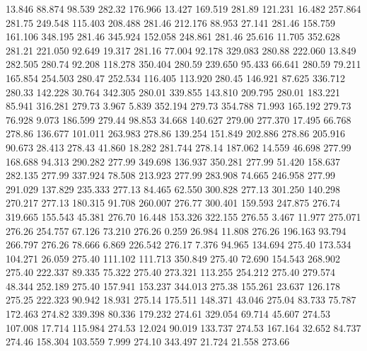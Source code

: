  13.846   88.874   98.539       282.32
 176.966   13.427  169.519       281.89
 121.231   16.482  257.864       281.75
 249.548  115.403  208.488       281.46
 212.176   88.953   27.141       281.46
 158.759  161.106  348.195       281.46
 345.924  152.058  248.861       281.46
  25.616   11.705  352.628       281.21
 221.050   92.649   19.317       281.16
  77.004   92.178  329.083       280.88
 222.060   13.849  282.505       280.74
  92.208  118.278  350.404       280.59
 239.650   95.433   66.641       280.59
  79.211  165.854  254.503       280.47
 252.534  116.405  113.920       280.45
 146.921   87.625  336.712       280.33
 142.228   30.764  342.305       280.01
 339.855  143.810  209.795       280.01
 183.221   85.941  316.281       279.73
   3.967    5.839  352.194       279.73
 354.788   71.993  165.192       279.73
  76.928    9.073  186.599       279.44
  98.853   34.668  140.627       279.00
 277.370   17.495   66.768       278.86
 136.677  101.011  263.983       278.86
 139.254  151.849  202.886       278.86
 205.916   90.673   28.413       278.43
  41.860   18.282  281.744       278.14
 187.062   14.559   46.698       277.99
 168.688   94.313  290.282       277.99
 349.698  136.937  350.281       277.99
  51.420  158.637  282.135       277.99
 337.924   78.508  213.923       277.99
 283.908   74.665  246.958       277.99
 291.029  137.829  235.333       277.13
  84.465   62.550  300.828       277.13
 301.250  140.298  270.217       277.13
 180.315   91.708  260.007       276.77
 300.401  159.593  247.875       276.74
 319.665  155.543   45.381       276.70
  16.448  153.326  322.155       276.55
   3.467   11.977  275.071       276.26
 254.757   67.126   73.210       276.26
   0.259   26.984   11.808       276.26
 196.163   93.794  266.797       276.26
  78.666    6.869  226.542       276.17
   7.376   94.965  134.694       275.40
 173.534  104.271   26.059       275.40
 111.102  111.713  350.849       275.40
  72.690  154.543  268.902       275.40
 222.337   89.335   75.322       275.40
 273.321  113.255  254.212       275.40
 279.574   48.344  252.189       275.40
 157.941  153.237  344.013       275.38
 155.261   23.637  126.178       275.25
 222.323   90.942   18.931       275.14
 175.511  148.371   43.046       275.04
  83.733   75.787  172.463       274.82
 339.398   80.336  179.232       274.61
 329.054   69.714   45.607       274.53
 107.008   17.714  115.984       274.53
  12.024   90.019  133.737       274.53
 167.164   32.652   84.737       274.46
 158.304  103.559    7.999       274.10
 343.497   21.724   21.558       273.66
